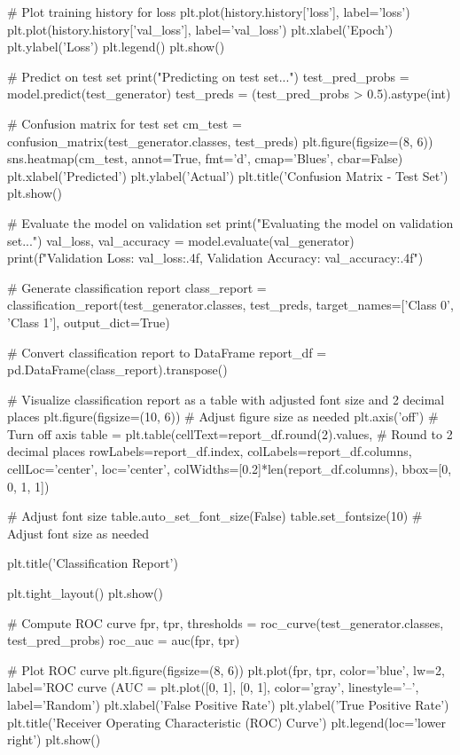 \begin{python}[caption={Python code for training the model}]
# Plot training history for loss
plt.plot(history.history['loss'], label='loss')
plt.plot(history.history['val_loss'], label='val_loss')
plt.xlabel('Epoch')
plt.ylabel('Loss')
plt.legend()
plt.show()

# Predict on test set
print("Predicting on test set...")
test_pred_probs = model.predict(test_generator)
test_preds = (test_pred_probs > 0.5).astype(int)


# Confusion matrix for test set
cm_test = confusion_matrix(test_generator.classes, test_preds)
plt.figure(figsize=(8, 6))
sns.heatmap(cm_test, annot=True, fmt='d', cmap='Blues', cbar=False)
plt.xlabel('Predicted')
plt.ylabel('Actual')
plt.title('Confusion Matrix - Test Set')
plt.show()

# Evaluate the model on validation set
print("Evaluating the model on validation set...")
val_loss, val_accuracy = model.evaluate(val_generator)
print(f"Validation Loss: {val_loss:.4f}, Validation Accuracy: {val_accuracy:.4f}")


# Generate classification report
class_report = classification_report(test_generator.classes, test_preds, target_names=['Class 0', 'Class 1'], output_dict=True)

# Convert classification report to DataFrame
report_df = pd.DataFrame(class_report).transpose()

# Visualize classification report as a table with adjusted font size and 2 decimal places
plt.figure(figsize=(10, 6))  # Adjust figure size as needed
plt.axis('off')  # Turn off axis
table = plt.table(cellText=report_df.round(2).values,  # Round to 2 decimal places
                  rowLabels=report_df.index,
                  colLabels=report_df.columns,
                  cellLoc='center',
                  loc='center',
                  colWidths=[0.2]*len(report_df.columns),
                  bbox=[0, 0, 1, 1])

# Adjust font size
table.auto_set_font_size(False)
table.set_fontsize(10)  # Adjust font size as needed

plt.title('Classification Report')

plt.tight_layout()
plt.show()

# Compute ROC curve
fpr, tpr, thresholds = roc_curve(test_generator.classes, test_pred_probs)
roc_auc = auc(fpr, tpr)

# Plot ROC curve
plt.figure(figsize=(8, 6))
plt.plot(fpr, tpr, color='blue', lw=2, label='ROC curve (AUC = %
plt.plot([0, 1], [0, 1], color='gray', linestyle='--', label='Random')
plt.xlabel('False Positive Rate')
plt.ylabel('True Positive Rate')
plt.title('Receiver Operating Characteristic (ROC) Curve')
plt.legend(loc='lower right')
plt.show()


\end{python}

